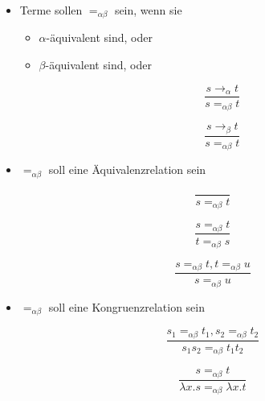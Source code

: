 \documentclass{scrartcl}
\begin{document}
\begin{itemize}
	\item Terme sollen $ =_{\alpha \beta} $ sein, wenn sie
	\begin{itemize}
		\item $ \alpha $-äquivalent sind, oder
		\item $ \beta $-äquivalent sind, oder \\
		
		\begin{minipage}{.5\linewidth}
			\begin{equation*}
				\frac{s \rightarrow_\alpha t}{s =_{\alpha \beta} t}
			\end{equation*}
		\end{minipage}
		\begin{minipage}{.5\linewidth}
			\begin{equation*}
				\frac{s \rightarrow_\beta t}{s =_{\alpha \beta} t}
			\end{equation*}
		\end{minipage}
	\end{itemize}
	\item $ =_{\alpha \beta} $ soll eine Äquivalenzrelation sein \\
	
	\begin{minipage}{.33\linewidth}
		\begin{equation*}
			\frac{}{s =_{\alpha \beta} t}
		\end{equation*}
	\end{minipage}
	\begin{minipage}{.33\linewidth}
		\begin{equation*}
			\frac{s =_{\alpha \beta} t}{t =_{\alpha \beta} s}
		\end{equation*}
	\end{minipage}
	\begin{minipage}{.33\linewidth}
		\begin{equation*}
			\frac{s =_{\alpha \beta} t, t =_{\alpha \beta} u}{s =_{\alpha \beta} u}
		\end{equation*}
	\end{minipage}
	\item $ =_{\alpha \beta} $ soll eine Kongruenzrelation sein \\
	
	\begin{minipage}{.5\linewidth}
		\begin{equation*}
			\frac{s_1 =_{\alpha \beta} t_1, s_2 =_{\alpha \beta} t_2}{s_1 s_2 =_{\alpha \beta} t_1 t_2}
		\end{equation*}
	\end{minipage}
	\begin{minipage}{.5\linewidth}
		\begin{equation*}
			\frac{s =_{\alpha \beta} t}{\lambda x.s =_{\alpha \beta} \lambda x.t}
		\end{equation*}
	\end{minipage}
\end{itemize}
\end{document}
